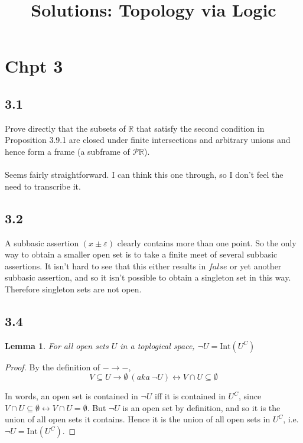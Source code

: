 \documentclass{article}
\title{Solutions: Topology via Logic}
\newtheorem{lemma}{Lemma}
\begin{document}
\maketitle

\section*{Chpt 3}

\subsection*{3.1}

Prove directly that the subsets of $\mathbb R$ that satisfy the second condition in Proposition 3.9.1 are closed
under finite intersections and arbitrary unions and hence form a frame (a subframe of $\mathcal P \mathbb R$).\\~\\
Seems fairly straightforward. I can think this one through, so I don't feel the need to transcribe it.

\subsection*{3.2}

A subbasic assertion $(x \pm \varepsilon)$ clearly contains more than one point. So the only way to obtain a smaller open
set is to take a finite meet of several subbasic assertions. It isn't hard to see that this either results in $\mathit{false}$ 
or yet another subbasic assertion, and so it isn't possible to obtain a singleton set in this way. Therefore singleton 
sets are not open.

\subsection*{3.4}

\begin{lemma}
For all open sets $U$ in a toplogical space, $\neg U = \text{Int}(U^C)$ 
\label{lemma3.4.1}
\end{lemma}

\begin{proof}
By the definition of $- \to -$, $$V \subseteq U \to \emptyset~(\mathit{aka}~\neg U) \leftrightarrow V \cap U \subseteq \emptyset$$

In words, an open set is contained in $\neg U$ iff it is contained in $U^C$, since $V \cap U \subseteq \emptyset \leftrightarrow V \cap U = \emptyset$. But $\neg U$ is an open set by definition, and so it is the union of all open sets it contains. Hence it is the union of all open sets in $U^C$, i.e. $\neg U = \text{Int}(U^C)$.

\end{proof}
\end{document}
